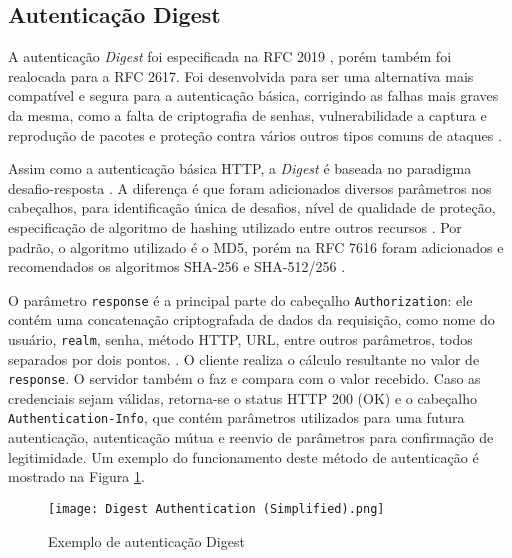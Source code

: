 \subsection{Autenticação Digest}

A autenticação \emph{Digest} foi especificada na RFC 2019 \cite{RFC2019}, porém também foi 
realocada para a RFC 2617. Foi desenvolvida para ser uma alternativa mais compatível e segura  para 
a autenticação básica, corrigindo as falhas mais graves da mesma, como a falta de criptografia de 
senhas, vulnerabilidade a captura e reprodução de pacotes e proteção contra vários outros tipos comuns de ataques \cite{GOURLEY2002}.

Assim como a autenticação básica HTTP, a \emph{Digest} é baseada no paradigma 
desafio-resposta \cite{RFC7616}. A diferença é que foram adicionados diversos parâmetros nos cabeçalhos, para identificação única de desafios, nível de qualidade de proteção, especificação de algoritmo de hashing utilizado entre outros recursos \cite{CHAPMAN2012}. Por padrão, o algoritmo utilizado é o MD5, porém na RFC 7616 foram adicionados e recomendados os algoritmos SHA-256 e SHA-512/256 \cite{RFC7616}.

O parâmetro \texttt{response} é a principal parte do cabeçalho \texttt{Authorization}: ele contém 
uma concatenação criptografada de dados da requisição, como nome do usuário, \texttt{realm}, senha, 
método HTTP, URL, entre outros parâmetros, todos separados por dois pontos. \cite{CHAPMAN2012}. O cliente realiza o cálculo resultante no valor de \texttt{response}. O servidor também o faz e 
compara com o valor recebido. Caso as credenciais sejam válidas, retorna-se o status HTTP 200 (OK)
e o cabeçalho \texttt{Authentication-Info}, que contém parâmetros utilizados para uma futura 
autenticação, autenticação mútua e reenvio de parâmetros para confirmação de legitimidade. Um 
exemplo do funcionamento deste método de autenticação é mostrado na Figura \ref{fig:digestAuth}.

\begin{figure}[ht]
  \centering
  \texttt{[image: Digest Authentication (Simplified).png]}
  \caption{Exemplo de autenticação Digest}
  \label{fig:digestAuth}
\end{figure}